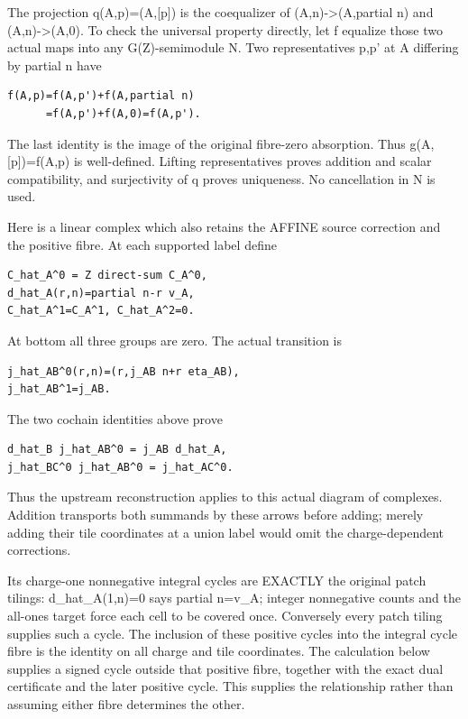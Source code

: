 \documentclass[
  10pt,
]{scrreprt}
\begin{document}
The projection q(A,p)=(A,{[}p{]}) is the coequalizer of
(A,n)-\textgreater(A,partial n) and (A,n)-\textgreater(A,0). To check
the universal property directly, let f equalize those two actual maps
into any G(Z)-semimodule N. Two representatives p,p' at A differing by
partial n have

\begin{verbatim}
f(A,p)=f(A,p')+f(A,partial n)
      =f(A,p')+f(A,0)=f(A,p').
\end{verbatim}

The last identity is the image of the original fibre-zero absorption.
Thus g(A,{[}p{]})=f(A,p) is well-defined. Lifting representatives proves
addition and scalar compatibility, and surjectivity of q proves
uniqueness. No cancellation in N is used.

Here is a linear complex which also retains the AFFINE source correction
and the positive fibre. At each supported label define

\begin{verbatim}
C_hat_A^0 = Z direct-sum C_A^0,
d_hat_A(r,n)=partial n-r v_A,
C_hat_A^1=C_A^1, C_hat_A^2=0.
\end{verbatim}

At bottom all three groups are zero. The actual transition is

\begin{verbatim}
j_hat_AB^0(r,n)=(r,j_AB n+r eta_AB),
j_hat_AB^1=j_AB.
\end{verbatim}

The two cochain identities above prove

\begin{verbatim}
d_hat_B j_hat_AB^0 = j_AB d_hat_A,
j_hat_BC^0 j_hat_AB^0 = j_hat_AC^0.
\end{verbatim}

Thus the upstream reconstruction applies to this actual diagram of
complexes. Addition transports both summands by these arrows before
adding; merely adding their tile coordinates at a union label would omit
the charge-dependent corrections.

Its charge-one nonnegative integral cycles are EXACTLY the original
patch tilings: d\_hat\_A(1,n)=0 says partial n=v\_A; integer nonnegative
counts and the all-ones target force each cell to be covered once.
Conversely every patch tiling supplies such a cycle. The inclusion of
these positive cycles into the integral cycle fibre is the identity on
all charge and tile coordinates. The calculation below supplies a signed
cycle outside that positive fibre, together with the exact dual
certificate and the later positive cycle. This supplies the relationship
rather than assuming either fibre determines the other.
\end{document}

